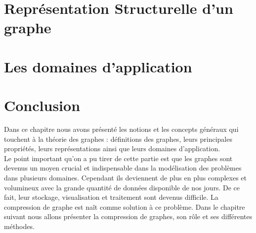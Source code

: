     	\section{Représentation Structurelle d'un graphe}	
		
	
	\section{Les domaines d'application}
			
		
	
	
			
	\section{Conclusion}
Dans ce chapitre nous avons présenté les notions et les concepts généraux qui touchent à la théorie des graphes : définitions des graphes, leurs principales propriétés, leurs représentations ainsi que leurs domaines d'application.\\
Le point important qu'on a pu tirer de cette partie est que les graphes sont devenus un moyen crucial et indispensable dans la modélisation des problèmes dans plusieurs domaines. Cependant ils deviennent de plus en plus complexes et volumineux avec la grande quantité de données disponible de nos jours. De ce fait, leur stockage, visualisation et traitement sont devenus difficile. La compression de graphe est naît comme solution à ce problème. Dans le chapitre suivant nous allons présenter la compression de graphes, son rôle et ses différentes méthodes.  
	
	